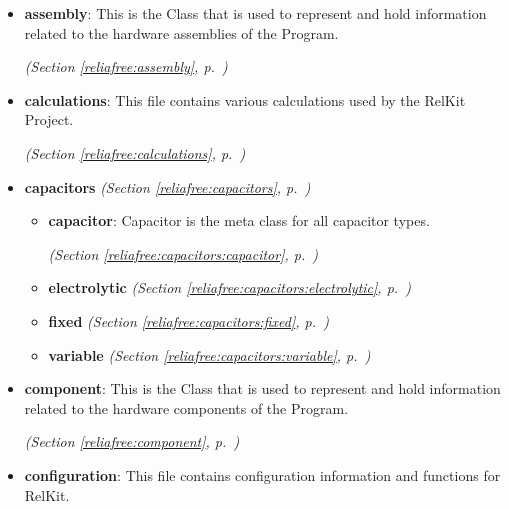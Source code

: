 \begin{itemize}
\setlength{\parskip}{0ex}
\item \textbf{assembly}: This is the Class that is used to represent and hold information related to
the hardware assemblies of the Program.



  \textit{(Section \ref{reliafree:assembly}, p.~\pageref{reliafree:assembly})}

\item \textbf{calculations}: This file contains various calculations used by the RelKit Project.



  \textit{(Section \ref{reliafree:calculations}, p.~\pageref{reliafree:calculations})}

\item \textbf{capacitors}
  \textit{(Section \ref{reliafree:capacitors}, p.~\pageref{reliafree:capacitors})}

  \begin{itemize}
\setlength{\parskip}{0ex}
    \item \textbf{capacitor}: Capacitor is the meta class for all capacitor types.



  \textit{(Section \ref{reliafree:capacitors:capacitor}, p.~\pageref{reliafree:capacitors:capacitor})}

    \item \textbf{electrolytic}
  \textit{(Section \ref{reliafree:capacitors:electrolytic}, p.~\pageref{reliafree:capacitors:electrolytic})}

    \item \textbf{fixed}
  \textit{(Section \ref{reliafree:capacitors:fixed}, p.~\pageref{reliafree:capacitors:fixed})}

    \item \textbf{variable}
  \textit{(Section \ref{reliafree:capacitors:variable}, p.~\pageref{reliafree:capacitors:variable})}

  \end{itemize}
\item \textbf{component}: This is the Class that is used to represent and hold information related to
the hardware components of the Program.



  \textit{(Section \ref{reliafree:component}, p.~\pageref{reliafree:component})}

\item \textbf{configuration}: This file contains configuration information and functions for RelKit.




\end{itemize}
